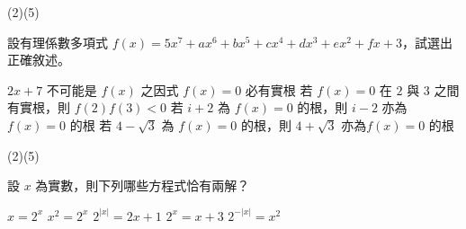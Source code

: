 \begin{QUESTIONS}
\begin{QUESTION}
    \begin{QANS}
        (2)(5)
    \end{QANS}
    \begin{QSOL}
    \end{QSOL}
    \begin{QEMPTYSPACE}
    \end{QEMPTYSPACE}
\end{QUESTION}
\begin{QUESTION}
    \begin{QBODY}
        設有理係數多項式 $f\left( x \right)=5{{x}^{7}}+a{{x}^{6}}+b{{x}^{5}}+c{{x}^{4}}+d{{x}^{3}}+e{{x}^{2}}+fx+3$，試選出正確敘述。
        \begin{QOPS}
            \QOP $2x+7$ 不可能是 $f\left( x \right)$ 之因式
            \QOP $f\left( x \right)=0$ 必有實根
            \QOP 若 $f\left( x \right)=0$ 在 $2$ 與 3 之間有實根，則 $f\left( 2 \right)f\left( 3 \right)<0$
            \QOP 若 $i+2$ 為 $f\left( x \right)=0$ 的根，則 $i-2$ 亦為 $f\left( x \right)=0$ 的根
            \QOP 若 $4-\sqrt{3}$ 為 $f\left( x \right)=0$ 的根，則 $4+\sqrt{3}$ 亦為$f\left( x \right)=0$ 的根
        \end{QOPS}
    \end{QBODY}
    \begin{QFROMS}
    \end{QFROMS}
    \begin{QTAGS} \end{QTAGS}
    \begin{QANS}
        (2)(5)
    \end{QANS}
    \begin{QSOL}
    \end{QSOL}
    \begin{QEMPTYSPACE}
    \end{QEMPTYSPACE}
\end{QUESTION}
\begin{QUESTION}
    \begin{QBODY}
        設 $x$ 為實數，則下列哪些方程式恰有兩解？\\
        \begin{QOPSINONELINE}
            \QOP $x={{2}^{x}}$ 
            \QOP ${{x}^{2}}={{2}^{x}}$ 
            \QOP ${{2}^{|x|}}=2x+1$ 
            \QOP ${{2}^{x}}=x+3$ 
            \QOP ${{2}^{-|x|}}={{x}^{2}}$
        \end{QOPSINONELINE}
    \end{QBODY}
    \begin{QFROMS}
    \end{QFROMS}

\end{QUESTION}
\end{QUESTIONS}
